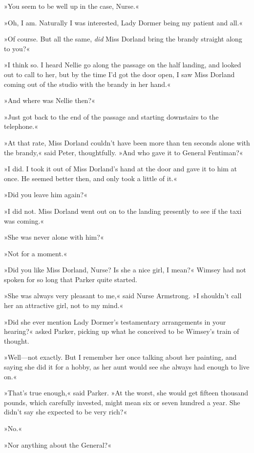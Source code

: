 »You seem to be well up in the case, Nurse.«

»Oh, I am. Naturally I was interested, Lady Dormer being my patient and all.«

»Of course. But all the same, \textit{did} Miss Dorland bring the brandy straight along to you?«

»I think so. I heard Nellie go along the passage on the half landing, and looked out to call to her, but by the time I'd got the door open, I saw Miss Dorland coming out of the studio with the brandy in her hand.«

»And where was Nellie then?«

»Just got back to the end of the passage and starting downstairs to the telephone.«

»At that rate, Miss Dorland couldn't have been more than ten seconds alone with the brandy,« said Peter, thoughtfully. »And who gave it to General Fentiman?«

»I did. I took it out of Miss Dorland's hand at the door and gave it to him at once. He seemed better then, and only took a little of it.«

»Did you leave him again?«

»I did not. Miss Dorland went out on to the landing presently to see if the taxi was coming.«

»She was never alone with him?«

»Not for a moment.«

»Did you like Miss Dorland, Nurse? Is she a nice girl, I mean?« Wimsey had not spoken for so long that Parker quite started.

»She was always very pleasant to me,« said Nurse Armstrong. »I shouldn't call her an attractive girl, not to my mind.«

»Did she ever mention Lady Dormer's testamentary arrangements in your hearing?« asked Parker, picking up what he conceived to be Wimsey's train of thought.

»Well—not exactly. But I remember her once talking about her painting, and saying she did it for a hobby, as her aunt would see she always had enough to live on.«

»That's true enough,« said Parker. »At the worst, she would get fifteen thousand pounds, which carefully invested, might mean six or seven hundred a year. She didn't say she expected to be very rich?«

»No.«

»Nor anything about the General?«

